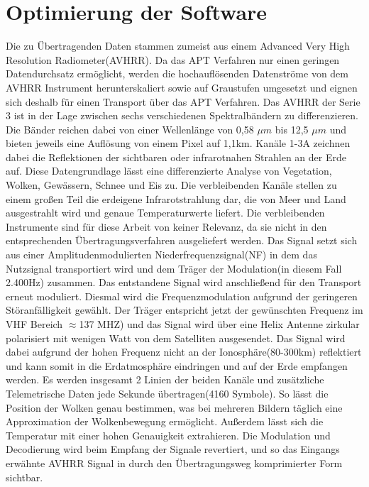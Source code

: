 \section[]{Optimierung der Software}
\begin{multicols*}{2}
    Die zu Übertragenden Daten stammen zumeist aus einem \glqq Advanced Very High Resolution Radiometer\grqq (AVHRR). Da das APT Verfahren nur einen geringen Datendurchsatz ermöglicht, werden die hochauflösenden Datenströme von dem AVHRR Instrument herunterskaliert sowie auf Graustufen umgesetzt und eignen sich deshalb für einen Transport über das APT Verfahren. Das AVHRR der Serie 3 ist in der Lage zwischen sechs verschiedenen Spektralbändern zu differenzieren. Die Bänder reichen dabei von einer Wellenlänge von 0,58 \( \mu m\) bis 12,5 \( \mu m\) und bieten jeweils eine Auflösung von einem Pixel auf 1,1km. Kanäle 1-3A zeichnen dabei die Reflektionen der sichtbaren oder infrarotnahen Strahlen an der Erde auf. 
    Diese Datengrundlage lässt eine differenzierte Analyse von Vegetation, Wolken, Gewässern, Schnee und Eis zu. Die verbleibenden Kanäle stellen zu einem großen Teil die erdeigene Infrarotstrahlung dar, die von Meer und Land ausgestrahlt wird und genaue Temperaturwerte liefert. 
    Die verbleibenden Instrumente sind für diese Arbeit von keiner Relevanz, da sie nicht in den entsprechenden Übertragungsverfahren ausgeliefert werden. 
    \cite{Apt-System} 
    Das Signal setzt sich aus einer Amplitudenmodulierten Niederfrequenzsignal(NF) in dem das Nutzsignal transportiert wird und dem Träger der Modulation(in diesem Fall 2.400Hz) zusammen. Das entstandene Signal wird anschließend für den Transport erneut moduliert. Diesmal wird die Frequenzmodulation aufgrund der geringeren Störanfälligkeit gewählt. Der Träger entspricht jetzt der gewünschten Frequenz im VHF Bereich \( \approx  \)137 MHZ) und das Signal wird über eine Helix Antenne zirkular polarisiert mit wenigen Watt von dem Satelliten ausgesendet. Das Signal wird dabei aufgrund der hohen Frequenz nicht an der Ionosphäre(80-300km) reflektiert und kann somit in die Erdatmosphäre eindringen und auf der Erde empfangen werden. Es werden insgesamt 2 Linien der beiden Kanäle und zusätzliche Telemetrische Daten jede Sekunde übertragen(4160 Symbole). So lässt die Position der Wolken genau bestimmen, was bei mehreren Bildern täglich eine Approximation der Wolkenbewegung ermöglicht. Außerdem lässt sich die Temperatur mit einer hohen Genauigkeit extrahieren. 
    \cite{APT-How_it_works}
    Die Modulation und Decodierung wird beim Empfang der Signale revertiert, und so das Eingangs erwähnte AVHRR Signal in durch den Übertragungsweg komprimierter Form sichtbar.

\end{multicols*}
